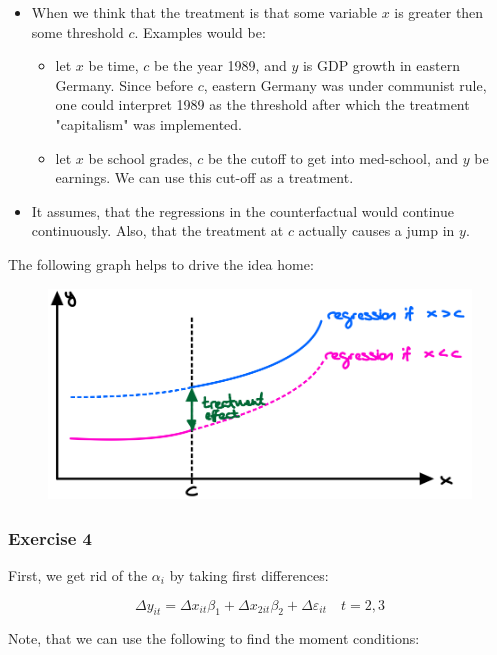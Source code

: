 {{\begin{itemize}
\item When we think that the treatment is that some variable $x$ is greater then some threshold $c$. Examples would be:
\begin{itemize}
    \item let $x$ be time, $c$ be the year 1989, and $y$ is GDP growth in eastern Germany. Since before $c$, eastern Germany was under communist rule, one could interpret 1989 as the threshold after which the treatment "capitalism" was implemented.
    \item let $x$ be school grades, $c$ be the cutoff to get into med-school, and $y$ be earnings. We can use this cut-off as a treatment.
\end{itemize}
\item It assumes, that the regressions in the counterfactual would continue continuously. Also, that the treatment at $c$ actually causes a jump in $y$.
\end{itemize}

The following graph helps to drive the idea home:

\begin{figure}[!htp]
    \centering
    \includegraphics[width=\textwidth]{images/2017_18.png}
\end{figure}
}
{
\FloatBarrier
\subsubsection*{Exercise 4}

First, we get rid of the $\alpha_{i}$ by taking first differences:

$$
\Delta y_{i t}=\Delta x_{i t} \beta_{1}+\Delta x_{2i t} \beta_{2}+\Delta \varepsilon_{i t} \quad t=2,3
$$

Note, that we can use the following to find the moment conditions:

}}
